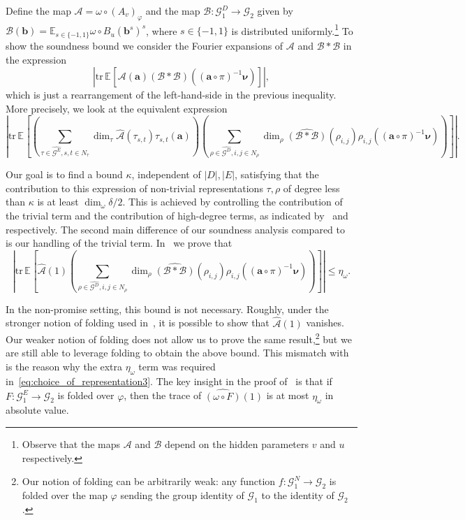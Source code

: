 \documentclass[a4paper,11pt]{article}
\theoremstyle{definition}
\newcommand{\tuple}[1]{{\mathbf{#1}}}
\newcommand{\ex}[1]{\mathbb{E}_{#1}}
\newcommand{\gr}{\mathscr{G}}
\newcommand{\tr}{\mathrm{tr}}
\newcommand{\A}{\mathcal{A}}
\newcommand{\B}{\mathcal{B}}
\begin{document}
Define the map
$\A= \omega\circ(A_v)_{\varphi}$ and
the map
$\B: \gr_1^D \rightarrow \gr_2$ given by $\B(\tuple{b}) = \ex{s\in \{-1,1\}} \omega \circ B_u(\tuple{b}^s)^s$, where $s\in \{-1, 1\}$ is distributed uniformly.\footnote{Observe that the maps $\A$ and $\B$ depend on the hidden parameters $v$ and $u$ respectively.} To show the soundness bound we consider the Fourier expansions of $\A$ and $\B*\B$ in the expression 
\[
\left|
\tr \, 
\ex{}\left[
\A(\tuple{a})
(\B*\B)( (\tuple{a} \circ \pi)^{-1}\bm{\nu}) 
\right]
\right|,\] which is just a rearrangement of the left-hand-side in the previous inequality. More precisely, we look at the equivalent expression 
\begin{equation}
\label{eq:choice_of_representation2}
\left|
\tr \, 
\ex{}\left[ 
\left(
\sum_{\tau\in \widehat{\gr^E}, s,t\in N_\tau}
\dim_\tau \widehat{\A}(\tau_{s,t}) \tau_{s,t}(\tuple{a})
\right)
\left(
\sum_{\rho\in \widehat{\gr^D}, i,j\in N_\rho}
\dim_\rho
\widehat{(\B*\B)}(\rho_{i,j})
\rho_{i,j}((\tuple{a} \circ \pi)^{-1}\bm{\nu}) \right)
\right]
\right|.
\end{equation}

 Our goal is to find a bound $\kappa$, independent of $|D|,|E|$, satisfying that the contribution to this expression of 
non-trivial representations $\tau, \rho$ of degree less than $\kappa$
%
is at least $\dim_\omega \delta/2$. This is achieved by controlling the contribution of the trivial term and the contribution of high-degree terms, as indicated by~ and~ respectively. 
The second main difference of our soundness analysis compared to~\cite{EHR04:tcs} is our handling of the trivial term. In~ we prove that 
\[ \left|
\tr \, 
\ex{}\left[ 
\widehat{\A}(1) 
\left(
\sum_{\rho\in \widehat{\gr^D}, i,j\in N_\rho}
\dim_\rho
\widehat{(\B*\B)}(\rho_{i,j})
\rho_{i,j}((\tuple{a} \circ \pi)^{-1}\bm{\nu}) \right)
\right]
\right| \leq \eta_\omega.
\]

In the non-promise setting, this bound is not necessary. Roughly, under the stronger notion of folding used in~\cite{EHR04:tcs}, it is possible to show that $\widehat{\A}(1)$ vanishes. Our weaker notion of folding does not allow us to prove the same result,\footnote{Our notion of folding can be arbitrarily weak: any function $f:\gr_1^N \rightarrow \gr_2$ is folded over the map $\varphi$ sending the group identity of $\gr_1$ to the identity of $\gr_2$.} but we are still able to leverage folding to obtain the above bound. This mismatch with~\cite{EHR04:tcs} is the reason why the extra $\eta_\omega$ term was required in~\eqref{eq:choice_of_representation3}. The key insight in the proof of~ is that if $F:\gr_1^E \rightarrow \gr_2$ is folded over $\varphi$, then the trace of $\widehat{(\omega \circ F)}(1)$ is at most $\eta_\omega$ in absolute value. \par
\end{document}

